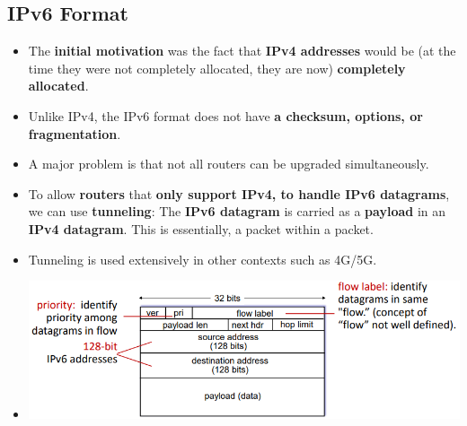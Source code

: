 \documentclass{article}
\begin{document}
    \subsection*{IPv6 Format}
    \begin{itemize}
        \item The \textbf{initial motivation} was the fact that \textbf{IPv4 addresses} would be (at the time they were not completely allocated, they are now) \textbf{completely allocated}.
        \item Unlike IPv4, the IPv6 format does not have \textbf{a checksum, options, or fragmentation}.
        \item A major problem is that not all routers can be upgraded simultaneously.
        \item To allow \textbf{routers} that \textbf{only support IPv4, to handle IPv6 datagrams}, we can use \textbf{tunneling}: The \textbf{IPv6 datagram} is carried as a \textbf{payload} in an \textbf{IPv4 datagram}. This is essentially, a packet within a packet.
        \item Tunneling is used extensively in other contexts such as 4G/5G.
        \item[] \includegraphics*[width=\textwidth - 25pt]{images/IPv6-Format.PNG}
    \end{itemize}
\end{document}
